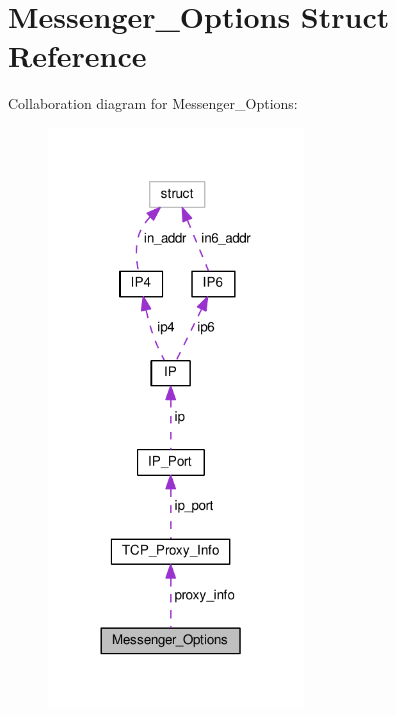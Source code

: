 \hypertarget{struct_messenger___options}{\section{Messenger\+\_\+\+Options Struct Reference}
\label{struct_messenger___options}
}


Collaboration diagram for Messenger\+\_\+\+Options\+:
\nopagebreak
\begin{figure}[H]
\begin{center}
\leavevmode
\includegraphics[width=192pt]{struct_messenger___options__coll__graph}
\end{center}
\end{figure}
